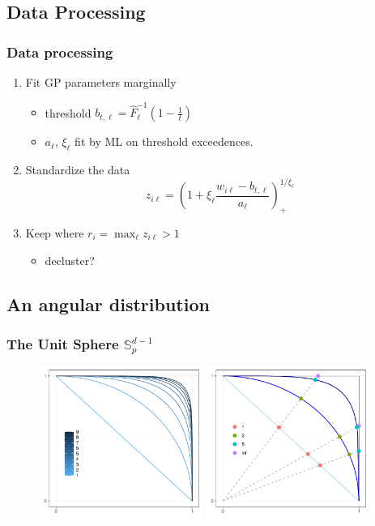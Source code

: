 \documentclass[aspectratio=169]{beamer}
\begin{document}
\subsection{Data Processing}
\begin{frame}
  \frametitle{Data processing}
  \begin{enumerate}
    \item Fit GP parameters marginally
      \begin{itemize}
        \item threshold $b_{t,\ell} = \hat{F}_{\ell}^{-1}\left(1 - \frac{1}{t}\right)$
        \item $a_{\ell}$, $\xi_{\ell}$ fit by ML on threshold exceedences.
      \end{itemize}
    \item Standardize the data
      \[
        z_{i\ell} = \left(1 + \xi_{\ell}\frac{w_{i\ell} -
         b_{t,\ell}}{a_{\ell}}\right)_{+}^{1/\xi_{\ell}}
      \]
    \item Keep where $r_i = \max_{\ell}z_{i\ell} > 1$
    \begin{itemize}
      \item decluster?
    \end{itemize}
  \end{enumerate}
\end{frame}

\subsection{An angular distribution}
\begin{frame}
  \frametitle{The Unit Sphere ${\mathbb S}_p^{d-1}$}
  \begin{figure}
     \includegraphics[width=0.475\textwidth]{./images/p_sphere}
     \hfill
     \includegraphics[width=0.475\textwidth]{./images/p_project}
  \end{figure}
\end{frame}
\end{document}

